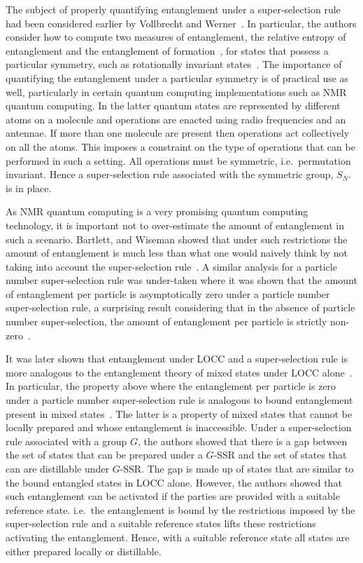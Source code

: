 \documentclass{article}
\begin{document}
The subject of properly quantifying entanglement under a super-selection rule had been considered earlier by Vollbrecht and Werner~\cite{VW01}.  In particular, the authors consider how to compute two measures of entanglement, the relative entropy of entanglement and the entanglement of formation~\cite{BDSW96}, for states that possess a particular symmetry, such as rotationally invariant states~\cite{W89}.  The importance of quantifying the entanglement under a particular symmetry is of practical use as well, particularly in certain quantum computing implementations such as NMR quantum computing.  In the latter quantum states are represented by different atoms on a molecule and operations are enacted using radio frequencies and an antennae.  If more than one molecule are present then operations act collectively on all the atoms.  This imposes a constraint on the type of operations that can be performed in such a setting.  All operations must be symmetric, i.e.~permutation invariant.  Hence a super-selection rule associated with the symmetric group, $S_N$. is in place.  

As NMR quantum computing is a very promising quantum computing technology, it is important not to over-estimate the amount of entanglement in such a scenario.  Bartlett, and Wiseman showed that under such restrictions the amount of entanglement is much less than what one would naively think by not taking into account the super-selection rule~\cite{BW03, WBV03}.  A similar analysis for a particle number super-selection rule was under-taken where it was shown that the amount of entanglement per particle is asymptotically zero under a particle number super-selection rule, a surprising result considering that in the absence of particle number super-selection, the amount of entanglement per particle is strictly non-zero~\cite{WV03,WBV03}.     

It was later shown that entanglement under LOCC and a super-selection rule is more analogous to the entanglement theory of mixed states under LOCC alone~\cite{BDSW06,JWBVP06}.  In particular, the property above where the entanglement per particle is zero under a particle number super-selection rule is analogous to bound entanglement present in mixed states~\cite{HHH98}.  The latter is a property of mixed states that cannot be locally prepared and whose entanglement is inaccessible.  Under a super-selection rule associated with a group $G$, the authors showed that there is a gap between the set of states that can be prepared under a $G$-SSR and the set of states that can are distillable under $G$-SSR.  The gap is made up of states that are similar to the bound entangled states in LOCC alone.  However, the authors showed that such entanglement can be activated if the parties are provided with a suitable reference state. i.e.~the entanglement is bound by the restrictions imposed by the super-selection rule and a suitable reference states lifts these restrictions activating the entanglement.  Hence, with a suitable reference state all states are either prepared locally or distillable.   
\end{document}
